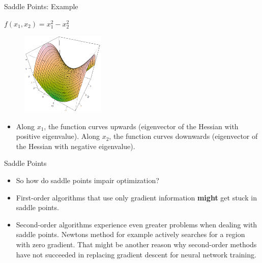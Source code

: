 \begin{vbframe}{Saddle Points: Example}
  \begin{center}
    $f(x_1, x_2) = x_1^2 - x_2^2$
  \end{center}
  \begin{figure}
    \centering
    \includegraphics[width=4cm]{figure/saddlepoint.png}
  \end{figure} 
  \begin{itemize}
    \item Along $x_1$, the function curves upwards (eigenvector of the Hessian with positive eigenvalue). Along $x_2$, the function curves downwards (eigenvector of the Hessian with negative eigenvalue).
  \end{itemize}
\end{vbframe}

\begin{vbframe}{Saddle Points}
  \begin{itemize}
    \item So how do saddle points impair optimization?
    \item First-order algorithms that use only gradient information \textbf{might} get stuck in saddle points.
    \item Second-order algorithms experience even greater problems when dealing with saddle points. Newtons method for example actively searches for a region with zero gradient. That might be another reason why second-order methods have not succeeded in replacing gradient descent for neural network training. 
  \end{itemize}
\end{vbframe}



